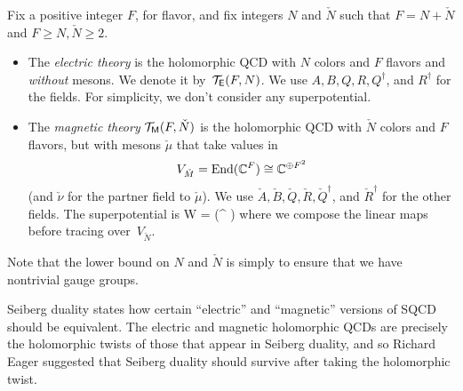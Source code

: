 \documentclass[11pt]{amsart}
\begin{document}
\begin{dfn}
Fix a positive integer $F$, for flavor, and fix integers $N$ and $\check{N}$ such that $F = N + \check{N}$ and $F \geq N, \check{N} \geq 2$.
\begin{itemize}
\item
The {\em electric theory} is the holomorphic QCD with $N$ colors and $F$ flavors and {\em without} mesons.
We denote it by~$\mathcal T_{\mathsf E}(F, N)$.
We use $A, B, Q, R, Q^\dag$, and $R^\dag$ for the fields.
For simplicity, we don't consider any superpotential.
\item
The {\em magnetic theory} $\mathcal T_{{\sf M}}(F, \check{N})$ is the holomorphic QCD with $\check{N}$ colors and $F$ flavors, but with mesons $\check{\mu}$ that take values in $$V_{\check{M}} = {\rm End}(\mathbb C^F) \cong \mathbb C^{\oplus F^2}$$
(and $\check{\nu}$ for the partner field to $\check{\mu}$).
We use $\check{A}, \check{B}, \check{Q}, \check{R}, \check{Q}^\dag$, and $\check{R}^\dag$ for the other fields.
The superpotential is 
\beqn\label{eqn:checkW}
\til W =  \Tr(^\dag \check{\mu}  )
\eeqn
where we compose the linear maps before tracing over~$V_{\check{N}}$.
\end{itemize}
\end{dfn}


Note that the lower bound on $N$ and $\check{N}$ is simply to ensure that we have nontrivial gauge groups.


Seiberg duality states how certain ``electric'' and ``magnetic'' versions of SQCD should be equivalent.
The electric and magnetic holomorphic QCDs are precisely the holomorphic twists of those that appear in Seiberg duality,
and so Richard Eager suggested that Seiberg duality should survive after taking the holomorphic twist.
\end{document}
